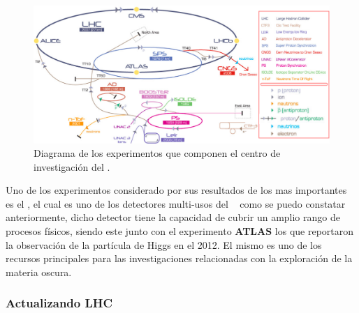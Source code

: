 \begin{figure}[h!]
\centering
\includegraphics[width=.9\textwidth]{Cap2/imagenes/cern.png}
\caption[Diagrama de los experimentos que componen el centro de investigación del \CERN.]{Diagrama de los experimentos que componen el centro de investigación del \CERN.\footnotemark}
    \label{cern}
\end{figure}

Uno de los experimentos considerado por sus resultados de los mas importantes es el \CMS, el cual es uno de los detectores multi-usos del \CERN ~ como se puedo constatar anteriormente, dicho detector tiene la capacidad de cubrir un amplio rango de procesos físicos, siendo este junto con el experimento \textbf{ATLAS} los que reportaron la observación de la partícula de Higgs en el 2012. El mismo es uno de los recursos principales para las investigaciones relacionadas con la exploración de la materia oscura.

\subsubsection{Actualizando LHC}

